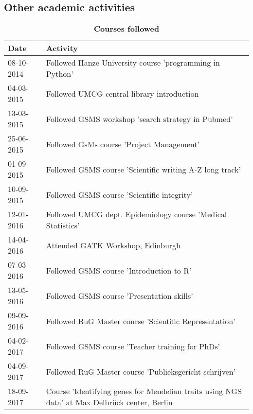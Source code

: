 \begin{appendices}
	\chapter{Other academic activities}
	
	\begin{table}
	\caption*{\textbf{Courses followed}}
		\footnotesize
		\begin{tabulary}{\linewidth}{LL}
			Date & Activity \\
			\hline
			\rule{0pt}{2.6ex}\mbox{08-10-2014 } & Followed Hanze University course 'programming in Python'  \\
			\rule{0pt}{2.6ex}\mbox{04-03-2015 } & Followed UMCG central library introduction \\
			\rule{0pt}{2.6ex}\mbox{13-03-2015 } & Followed GSMS workshop 'search strategy in Pubmed'\\
			\rule{0pt}{2.6ex}\mbox{25-06-2015 } & Followed GsMs course 'Project Management' \\
			\rule{0pt}{2.6ex}\mbox{01-09-2015 } & Followed GSMS course 'Scientific writing A-Z long track' \\
			\rule{0pt}{2.6ex}\mbox{10-09-2015 } & Followed GSMS course 'Scientific integrity'\\
			\rule{0pt}{2.6ex}\mbox{12-01-2016 } & Followed UMCG dept. Epidemiology course 'Medical Statistics'\\
			\rule{0pt}{2.6ex}\mbox{14-04-2016 } & Attended GATK Workshop, Edinburgh\\
			\rule{0pt}{2.6ex}\mbox{07-03-2016 } & Followed GSMS course 'Introduction to R'\\
			\rule{0pt}{2.6ex}\mbox{13-05-2016 } & Followed GSMS course 'Presentation skills'\\
			\rule{0pt}{2.6ex}\mbox{09-09-2016 } & Followed RuG Master course 'Scientific Representation'\\
			\rule{0pt}{2.6ex}\mbox{04-02-2017 } & Followed GSMS course 'Teacher training for PhDs'\\
			\rule{0pt}{2.6ex}\mbox{04-09-2017 } & Followed RuG Master course 'Publieksgericht schrijven'\\
			\rule{0pt}{2.6ex}\mbox{18-09-2017 } & Course 'Identifying genes for Mendelian traits using NGS data' at Max Delbrück center, Berlin\\
			\hline
		\end{tabulary}
\label{table:appendix_activities_1}
\end{table}			
			


\end{appendices}

